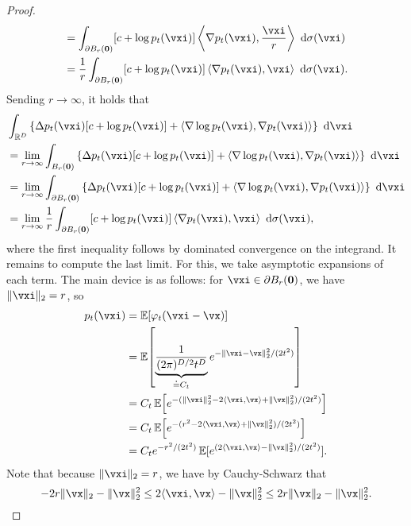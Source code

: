 \documentclass[../../book-main.tex]{subfiles}
\begin{document}
\begin{proof}
\begin{align}
        &= \int_{\partial B_{r}(\vzero)}[c + \log p_{t}(\vxi)]\ip*{\nabla p_{t}(\vxi)}{\frac{\vxi}{r}}\odif{\sigma(\vxi)} \\
        &= \frac{1}{r}\int_{\partial B_{r}(\vzero)}[c + \log p_{t}(\vxi)]\ip*{\nabla p_{t}(\vxi)}{\vxi}\odif{\sigma(\vxi)}.
    \end{align}
    Sending \(r \to \infty\), it holds that 
    \begin{align}
        &\int_{\R^{D}}\bc{\Delta p_{t}(\vxi)[c + \log p_{t}(\vxi)] + \ip{\nabla \log p_{t}(\vxi)}{\nabla p_{t}(\vxi)}}\odif{\vxi} \label{eq:app_diffusion_r_infinity_limit} \\
        &= \lim_{r \to \infty}\int_{B_{r}(\vzero)}\bc{\Delta p_{t}(\vxi)[c + \log p_{t}(\vxi)] + \ip{\nabla \log p_{t}(\vxi)}{\nabla p_{t}(\vxi)}}\odif{\vxi} \\
        &= \lim_{r \to \infty}\int_{\partial B_{r}(\vzero)}\bc{\Delta p_{t}(\vxi)[c + \log p_{t}(\vxi)] + \ip{\nabla \log p_{t}(\vxi)}{\nabla p_{t}(\vxi)}}\odif{\vxi} \\ 
        &= \lim_{r \to \infty}\frac{1}{r}\int_{\partial B_{r}(\vzero)}[c + \log p_{t}(\vxi)]\ip*{\nabla p_{t}(\vxi)}{\vxi}\odif{\sigma(\vxi)},
    \end{align}
    where the first inequality follows by dominated convergence on the integrand. It remains to compute the last limit. For this, we take asymptotic expansions of each term. The main device is as follows: for \(\vxi \in \partial B_{r}(\vzero)\), we have \(\norm{\vxi}_{2} = r\), so
    \begin{align}
        p_{t}(\vxi)
        &= \Ex[\phi_{t}(\vxi - \vx)] \\ 
        &= \Ex\rs{\underbrace{\frac{1}{(2\pi)^{D/2}t^{D}}}_{\doteq C_{t}}e^{-\|\vxi - \vx\|_{2}^{2}/(2t^{2})}} \\
        &= C_{t}\Ex\rs{e^{-(\norm{\vxi}_{2}^{2} - 2\ip{\vxi}{\vx} + \norm{\vx}_{2}^{2})/(2t^{2})}} \\ 
        &= C_{t}\Ex\rs{e^{-(r^{2} - 2\ip{\vxi}{\vx} + \norm{\vx}_{2}^{2})/(2t^{2})}} \\ 
        &= C_{t}e^{-r^{2}/(2t^{2})}\Ex[e^{(2\ip{\vxi}{\vx} - \norm{\vx}_{2}^{2})/(2t^{2})}]. 
    \end{align}
    Note that because \(\norm{\vxi}_{2} = r\), we have by Cauchy-Schwarz that
    \begin{equation}
        -2r\norm{\vx}_{2} - \norm{\vx}_{2}^{2} \leq 2\ip{\vxi}{\vx} - \norm{\vx}_{2}^{2} \leq 2r\norm{\vx}_{2} - \norm{\vx}_{2}^{2}.
    \end{equation}

\end{proof}
\end{document}
